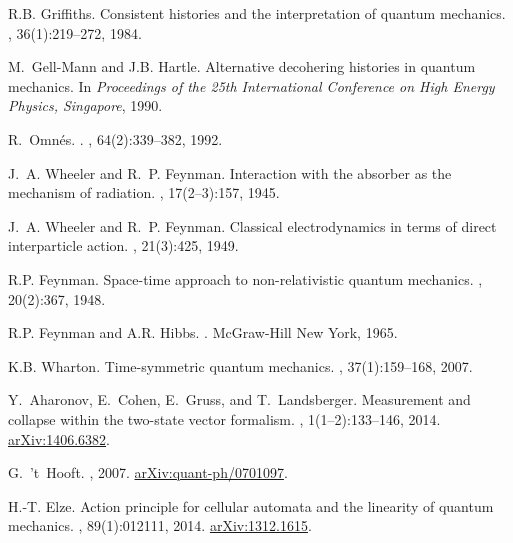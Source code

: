\documentclass[12pt]{amsart}
\theoremstyle{definition}
\theoremstyle{plain}
\begin{document}
\begin{thebibliography}{10}
R.B. Griffiths.
\newblock Consistent histories and the interpretation of quantum mechanics.
, 36(1):219--272, 1984.

M.~Gell-Mann and J.B. Hartle.
\newblock Alternative decohering histories in quantum mechanics.
\newblock In {\em Proceedings of the 25th International Conference on High
  Energy Physics, Singapore}, 1990.

R.~Omn\'es.
.
, 64(2):339--382, 1992.

J.~A. Wheeler and R.~P. Feynman.
\newblock Interaction with the absorber as the mechanism of radiation.
, 17(2--3):157, 1945.

J.~A. Wheeler and R.~P. Feynman.
\newblock Classical electrodynamics in terms of direct interparticle action.
, 21(3):425, 1949.

R.P. Feynman.
\newblock Space-time approach to non-relativistic quantum mechanics.
, 20(2):367, 1948.

R.P. Feynman and A.R. Hibbs.
.
\newblock McGraw-Hill New York, 1965.

K.B. Wharton.
\newblock Time-symmetric quantum mechanics.
, 37(1):159--168, 2007.

Y.~Aharonov, E.~Cohen, E.~Gruss, and T.~Landsberger.
\newblock Measurement and collapse within the two-state vector formalism.
, 1(1--2):133--146, 2014.
\newblock \href{http://arxiv.org/abs/1406.6382}{arXiv:1406.6382}.

G.~'t~Hooft.
, 2007.
\newblock \href{http://arxiv.org/abs/quant-ph/0701097}{arXiv:quant-ph/0701097}.

H.-T. Elze.
\newblock Action principle for cellular automata and the linearity of quantum
  mechanics.
, 89(1):012111, 2014.
\newblock \href{http://arxiv.org/abs/1312.1615}{arXiv:1312.1615}.


\end{thebibliography}
\end{document}
